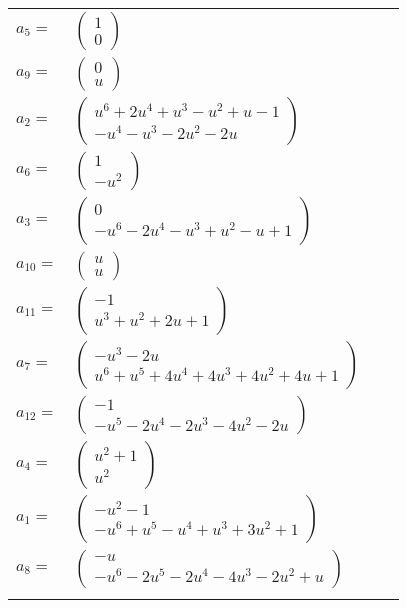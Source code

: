 \documentclass[1p]{elsarticle_modified}
\theoremstyle{definition}
\begin{document}
\begin{tabular}{m{7pt} m{180pt} m{7pt} m{180pt} }
\flushright $a_{5}=$&$\begin{pmatrix}1\\0\end{pmatrix}$ \\
\flushright $a_{9}=$&$\begin{pmatrix}0\\u\end{pmatrix}$ \\
\flushright $a_{2}=$&$\begin{pmatrix}u^6+2 u^4+u^3- u^2+u-1\\- u^4- u^3-2 u^2-2 u\end{pmatrix}$ \\
\flushright $a_{6}=$&$\begin{pmatrix}1\\- u^2\end{pmatrix}$ \\
\flushright $a_{3}=$&$\begin{pmatrix}0\\- u^6-2 u^4- u^3+u^2- u+1\end{pmatrix}$ \\
\flushright $a_{10}=$&$\begin{pmatrix}u\\u\end{pmatrix}$ \\
\flushright $a_{11}=$&$\begin{pmatrix}-1\\u^3+u^2+2 u+1\end{pmatrix}$ \\
\flushright $a_{7}=$&$\begin{pmatrix}- u^3-2 u\\u^6+u^5+4 u^4+4 u^3+4 u^2+4 u+1\end{pmatrix}$ \\
\flushright $a_{12}=$&$\begin{pmatrix}-1\\- u^5-2 u^4-2 u^3-4 u^2-2 u\end{pmatrix}$ \\
\flushright $a_{4}=$&$\begin{pmatrix}u^2+1\\u^2\end{pmatrix}$ \\
\flushright $a_{1}=$&$\begin{pmatrix}- u^2-1\\- u^6+u^5- u^4+u^3+3 u^2+1\end{pmatrix}$ \\
\flushright $a_{8}=$&$\begin{pmatrix}- u\\- u^6-2 u^5-2 u^4-4 u^3-2 u^2+u\end{pmatrix}$\\&\end{tabular}
\end{document}
